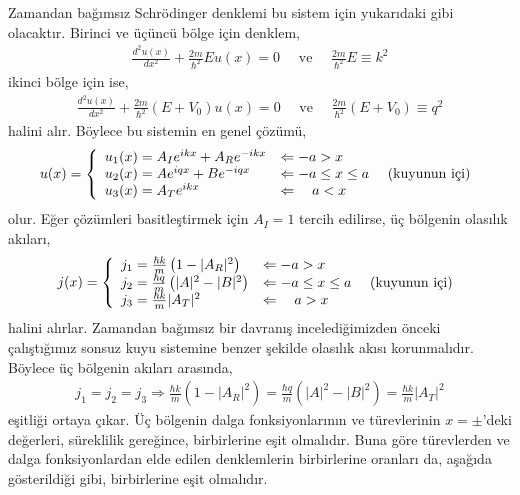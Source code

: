 \documentclass[a4paper,12pt, twoside]{article}
\begin{document}
Zamandan bağımsız Schrödinger denklemi bu sistem için yukarıdaki gibi olacaktır. Birinci ve üçüncü bölge için denklem,
\begin{align}
\frac { d ^ { 2 } u ( x ) } { d x ^ { 2 } } +  \frac { 2 m} { \hbar ^ { 2 } } E u ( x ) = 0 \quad \text{ ve } \quad \frac { 2 m} { \hbar ^ { 2 } } E \equiv k ^ { 2 }
\end{align}
ikinci bölge için ise,
\begin{align}
\frac { d ^ { 2 } u ( x ) } { d x ^ { 2 } } +  \frac { 2 m} { \hbar ^ { 2 } }  \left( E + V _ { 0 } \right) u ( x ) = 0 \quad \text{ ve } \quad \frac { 2 m} { \hbar ^ { 2 } }  \left( E + V _ { 0 } \right) \equiv q ^ { 2 }
\end{align}
halini alır. Böylece bu sistemin en genel çözümü,
\begin{align}
u ( x )  = \left\{ 
\begin{array} { l l } 
{u_1(x) = A_I e^{i k x} + A_R e^{-i k x} } & {\Leftarrow -a > x } \\
{u_2(x) = A e^{i q x} + B e^{-i q x} } & {\Leftarrow -a \leq x \leq a } \quad \text{ (kuyunun içi)} \\
{u_3(x) = A_T e^{i k x}} & {\Leftarrow \quad a < x }
\end{array} \right. 
\end{align}
olur. Eğer çözümleri basitleştirmek için $A_I=1$ tercih edilirse, üç bölgenin olasılık akıları,
\begin{align}
j ( x )  = \left\{ 
\begin{array} { l l } 
{j_1 = \frac{\hbar k}{m}\left(1-|A_R|^{2}\right) } & {\Leftarrow -a > x } \\
{j_2 = \frac{\hbar q}{m}\left(|A|^{2}-|B|^{2}\right) } & {\Leftarrow -a \leq x \leq a } \quad \text{ (kuyunun içi)} \\
{j_3 = \frac{\hbar k}{m}|A_T|^{2}} & {\Leftarrow \quad a > x }
\end{array} \right. 
\end{align}
halini alırlar. Zamandan bağımsız bir davranış incelediğimizden önceki çalıştığımız sonsuz kuyu sistemine benzer şekilde olasılık akısı korunmalıdır. Böylece üç bölgenin akıları arasında,
\begin{align}
	j_1 = 	j_2 = 	j_3 \Longrightarrow \frac{\hbar k}{m}\left(1-|A_R|^{2}\right)=\frac{\hbar q}{m}\left(|A|^{2}-|B|^{2}\right)=\frac{\hbar k}{m}|A_T|^{2}
	\label{eq:sonlukuyu_j1j2j3}
\end{align}
eşitliği ortaya çıkar. Üç bölgenin dalga fonksiyonlarının ve türevlerinin $x=\pm$'deki değerleri, süreklilik gereğince, birbirlerine eşit olmalıdır. Buna göre türevlerden ve dalga fonksiyonlardan elde edilen denklemlerin birbirlerine oranları da, aşağıda gösterildiği gibi, birbirlerine eşit olmalıdır. 
\end{document}
